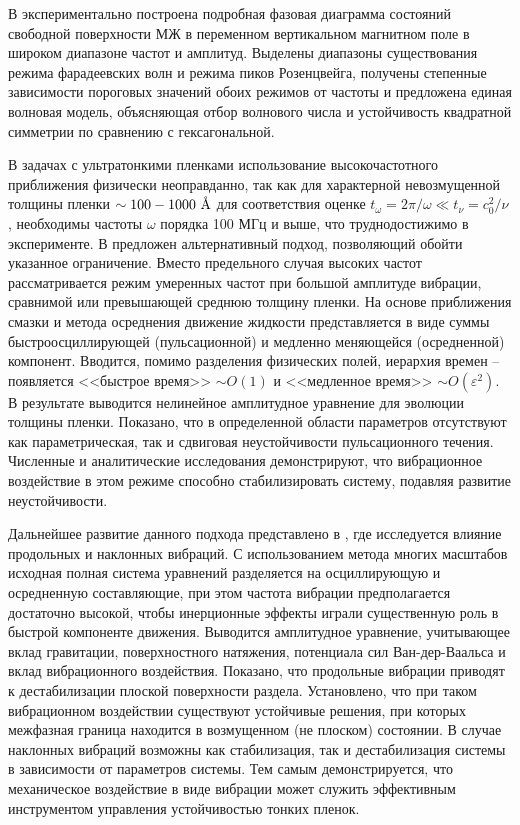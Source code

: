 \documentclass[12pt,a4paper]{article}
\begin{document}
В \cite{Wang2025} экспериментально построена подробная фазовая диаграмма состояний свободной поверхности МЖ в переменном вертикальном магнитном поле в широком диапазоне частот и амплитуд. Выделены диапазоны существования режима фарадеевских волн и режима пиков Розенцвейга, получены степенные зависимости пороговых значений обоих режимов от частоты и предложена единая волновая модель, объясняющая отбор волнового числа и устойчивость квадратной симметрии по сравнению с гексагональной.


В задачах с ультратонкими пленками использование высокочастотного приближения физически неоправданно, так как для  характерной невозмущенной толщины пленки $\sim 100-1000 \textup{~\AA} $ для соответствия оценке $t_{\omega} = 2 \pi / \omega \ll t_{\nu} = c_0^2/\nu$, необходимы частоты $\omega$ порядка 100 МГц и выше, что труднодостижимо в эксперименте. В \cite{Shklyaev2008} предложен альтернативный подход, позволяющий обойти указанное ограничение. Вместо предельного случая высоких частот рассматривается режим умеренных частот при большой амплитуде вибрации, сравнимой или превышающей среднюю толщину пленки. На основе приближения смазки и метода осреднения движение жидкости представляется в виде суммы быстроосциллирующей (пульсационной) и медленно меняющейся (осредненной) компонент. Вводится, помимо разделения физических полей, иерархия времен -- появляется <<быстрое время>> $\sim O(1)$ и <<медленное время>> $\sim O(\varepsilon^2)$. В результате выводится нелинейное амплитудное уравнение для эволюции толщины пленки. Показано, что в определенной области параметров отсутствуют как параметрическая, так и сдвиговая неустойчивости пульсационного течения. Численные и аналитические исследования демонстрируют, что вибрационное воздействие в этом режиме способно стабилизировать систему, подавляя развитие неустойчивости.

Дальнейшее развитие данного подхода представлено в \cite{Shklyaev2009}, где исследуется влияние продольных и наклонных вибраций. С использованием метода многих масштабов исходная полная система уравнений разделяется на осциллирующую и осредненную составляющие, при этом частота вибрации предполагается достаточно высокой, чтобы инерционные эффекты играли существенную роль в быстрой компоненте движения. Выводится амплитудное уравнение, учитывающее вклад гравитации, поверхностного натяжения, потенциала сил Ван-дер-Ваальса и вклад вибрационного воздействия. Показано, что продольные вибрации приводят к дестабилизации плоской поверхности раздела. Установлено, что при таком вибрационном воздействии существуют устойчивые решения, при которых межфазная граница находится в возмущенном (не плоском) состоянии. В случае наклонных вибраций возможны как стабилизация, так и дестабилизация системы в зависимости от параметров системы. Тем самым демонстрируется, что механическое воздействие в виде вибрации может служить эффективным инструментом управления устойчивостью тонких пленок.
\end{document}
